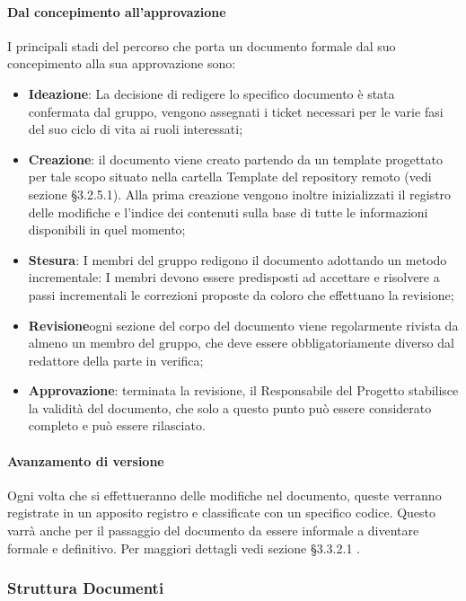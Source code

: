 			\paragraph{Dal concepimento all’approvazione }
				I principali stadi del percorso che porta un documento formale dal suo concepimento alla sua approvazione sono:
				\begin{itemize}
					\item\textbf{Ideazione}:  La decisione di redigere lo specifico documento è stata confermata dal gruppo, vengono assegnati i ticket necessari per le varie fasi del suo ciclo di vita ai ruoli interessati;
					\item\textbf{Creazione}: il documento viene creato partendo da un template progettato per tale scopo situato nella cartella Template del repository remoto (vedi sezione §3.2.5.1). Alla prima creazione vengono inoltre inizializzati il registro delle modifiche e l’indice dei contenuti sulla base di tutte le informazioni disponibili in quel momento;
					\item\textbf{Stesura}: I membri del gruppo redigono il documento adottando un metodo incrementale: I membri devono essere predisposti ad accettare e risolvere a passi incrementali le correzioni proposte da coloro che effettuano la revisione;
					\item\textbf{Revisione}ogni sezione del corpo del documento viene regolarmente rivista da almeno un membro del gruppo, che deve essere obbligatoriamente diverso dal redattore della parte in verifica;
					\item\textbf{Approvazione}: terminata la revisione, il Responsabile del Progetto stabilisce la validità del documento, che solo a questo punto può essere considerato completo e può essere rilasciato.
				\end{itemize}
			\paragraph{Avanzamento di versione}
				Ogni volta che si effettueranno delle modifiche nel documento, queste verranno registrate in un apposito registro e classificate con un specifico codice. Questo varrà anche per il passaggio del documento da essere informale a diventare formale e definitivo.
				Per maggiori dettagli vedi sezione §3.3.2.1 .


		\subsubsection{Struttura Documenti}
